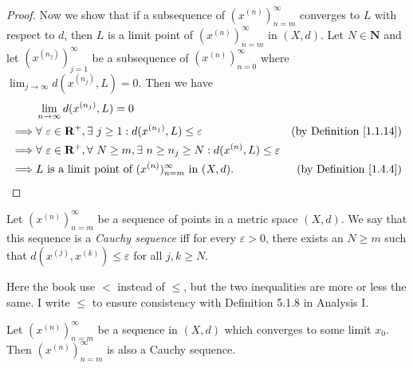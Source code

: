 \begin{proof}
    Now we show that if a subsequence of \((x^{(n)})_{n = m}^\infty\) converges to \(L\) with respect to \(d\), then \(L\) is a limit point of \((x^{(n)})_{n = m}^\infty\) in \((X, d)\).
    Let \(N \in \mathbf{N}\) and let \((x^{(n_j)})_{j = 1}^\infty\) be a subsequence of \((x^{(n)})_{n = 0}^\infty\) where \(\lim_{j \to \infty} d(x^{(n_j)}, L) = 0\).
    Then we have
    \begin{align*}
                 & \lim_{n \to \infty} d(x^{(n_j)}, L) = 0                                                                                                                      \\
        \implies & \forall\ \varepsilon \in \mathbf{R}^+, \exists\ j \geq 1 : d(x^{(n_j)}, L) \leq \varepsilon                            & \text{(by Definition \ref{1.1.14})} \\
        \implies & \forall\ \varepsilon \in \mathbf{R}^+,  \forall\ N \geq m, \exists\ n \geq n_j \geq N : d(x^{(n)}, L) \leq \varepsilon                                       \\
        \implies & L \text{ is a limit point of } (x^{(n)})_{n = m}^\infty \text{ in } (X, d).                                            & \text{(by Definition \ref{1.4.4})}
    \end{align*}
\end{proof}

\begin{definition}\label{1.4.6}
    Let \((x^{(n)})_{n = m}^\infty\) be a sequence of points in a metric space \((X, d)\).
    We say that this sequence is a \emph{Cauchy sequence} iff for every \(\varepsilon > 0\), there exists an \(N \geq m\) such that \(d(x^{(j)}, x^{(k)}) \leq \varepsilon\) for all \(j, k \geq N\).
\end{definition}

\begin{note}
    Here the book use \(<\) instead of \(\leq\), but the two inequalities are more or less the same.
    I write \(\leq\) to ensure consistency with Definition 5.1.8 in Analysis I.
\end{note}

\begin{lemma}\label{1.4.7}
    Let \((x^{(n)})_{n = m}^\infty\) be a sequence in \((X, d)\) which converges to some limit \(x_0\).
    Then \((x^{(n)})_{n = m}^\infty\) is also a Cauchy sequence.
\end{lemma}

